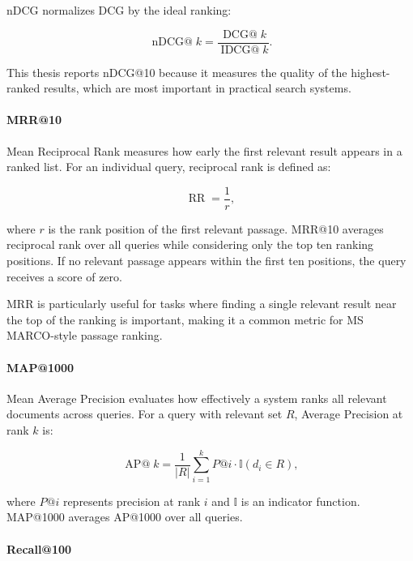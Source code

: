 nDCG normalizes DCG by the ideal ranking:

\begin{equation}
    \operatorname{nDCG@}k =
    \frac{\operatorname{DCG@}k}{\operatorname{IDCG@}k}.
\end{equation}

This thesis reports nDCG@10 because it measures the quality of the highest-ranked results, which are most important in practical search systems.

\paragraph{MRR@10}
\label{subsec:background_mrr}

Mean Reciprocal Rank measures how early the first relevant result appears in a ranked list. For an individual query, reciprocal rank is defined as:

\begin{equation}
    \operatorname{RR} = \frac{1}{r},
\end{equation}

where $r$ is the rank position of the first relevant passage. MRR@10 averages reciprocal rank over all queries while considering only the top ten ranking positions. If no relevant passage appears within the first ten positions, the query receives a score of zero.

MRR is particularly useful for tasks where finding a single relevant result near the top of the ranking is important, making it a common metric for MS MARCO-style passage ranking.

\paragraph{MAP@1000}
\label{subsec:background_map}

Mean Average Precision evaluates how effectively a system ranks all relevant documents across queries. For a query with relevant set $R$, Average Precision at rank $k$ is:

\begin{equation}
    \operatorname{AP@}k =
    \frac{1}{|R|}
    \sum_{i=1}^{k}
    P@i \cdot \mathbb{I}(d_i \in R),
\end{equation}

where $P@i$ represents precision at rank $i$ and $\mathbb{I}$ is an indicator function. MAP@1000 averages AP@1000 over all queries.

\paragraph{Recall@100}
\label{subsec:background_recall}

